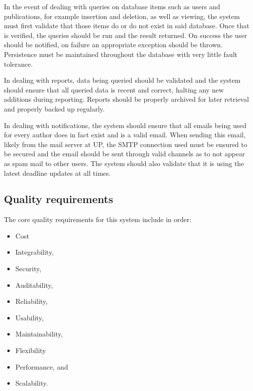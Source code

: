 \documentclass{article}
\begin{document}
	\par In the event of dealing with queries on database items such as users and publications, for example insertion and deletion, as well as viewing, the system must first validate that those items do or do not exist in said database. Once that is verified, the queries should be run and the result returned. On success the user should be notified, on failure an appropriate exception should be thrown. Persistence must be maintained throughout the database with very little fault tolerance.\\
	
	\par In dealing with reports, data being queried should be validated and the system should ensure that all queried data is recent and correct, halting any new additions during reporting. Reports should be properly archived for later retrieval and properly backed up regularly.\\
	
	\par In dealing with notifications, the system should ensure that all emails being used for every author does in fact exist and is a valid email. When sending this email, likely from the mail server at UP, the SMTP connection used must be ensured to be secured and the email should be sent through valid channels as to not appear as spam mail to other users. The system should also validate that it is using the latest deadline updates at all times.
	
	
	\cleardoublepage
	
	\subsection{Quality requirements}\label{subsec:quality}
	
	The core quality requirements for this system include in order:
	
	\begin{itemize}
		\item Cost
		\item Integrability,
		\item Security,
		\item Auditability,
		\item Reliability,
		\item Usability,
		\item Maintainability,
		\item Flexibility
		\item Performance, and
		\item Scalability. \newline
	\end{itemize}
	
\end{document}
